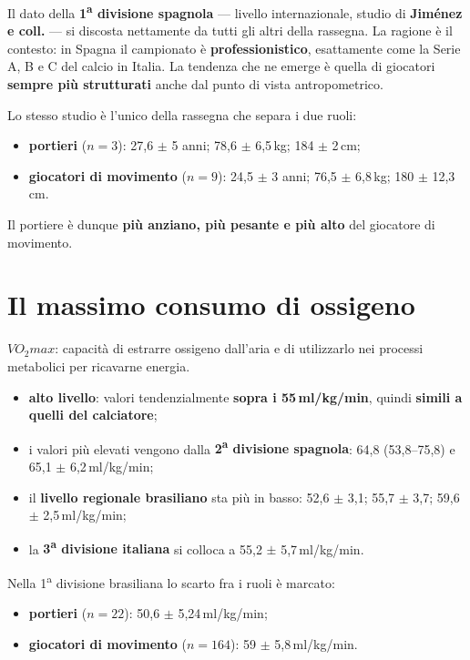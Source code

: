 Il dato della \textbf{1\textsuperscript{a} divisione spagnola} --- livello internazionale, studio
di \textbf{Jiménez e coll.} --- si discosta nettamente da tutti gli altri della rassegna. La
ragione è il contesto: in Spagna il campionato è \textbf{professionistico}, esattamente come la
Serie A, B e C del calcio in Italia. La tendenza che ne emerge è quella di giocatori
\textbf{sempre più strutturati} anche dal punto di vista antropometrico.

Lo stesso studio è l'unico della rassegna che separa i due ruoli:

\begin{itemize}
  \item \textbf{portieri} ($n = 3$): 27,6 $\pm$ 5 anni; 78,6 $\pm$ 6,5\,kg; 184 $\pm$ 2\,cm;
  \item \textbf{giocatori di movimento} ($n = 9$): 24,5 $\pm$ 3 anni; 76,5 $\pm$ 6,8\,kg;
    180 $\pm$ 12,3\,cm.
\end{itemize}

Il portiere è dunque \textbf{più anziano, più pesante e più alto} del giocatore di movimento.

\section{Il massimo consumo di ossigeno}

\textbf{$VO_2max$}: capacità di estrarre ossigeno dall'aria e di utilizzarlo nei processi
metabolici per ricavarne energia.

\begin{itemize}
  \item \textbf{alto livello}: valori tendenzialmente \textbf{sopra i 55\,ml/kg/min}, quindi
    \textbf{simili a quelli del calciatore};
  \item i valori più elevati vengono dalla \textbf{2\textsuperscript{a} divisione spagnola}:
    64,8 (53,8--75,8) e 65,1 $\pm$ 6,2\,ml/kg/min;
  \item il \textbf{livello regionale brasiliano} sta più in basso: 52,6 $\pm$ 3,1;
    55,7 $\pm$ 3,7; 59,6 $\pm$ 2,5\,ml/kg/min;
  \item la \textbf{3\textsuperscript{a} divisione italiana} si colloca a 55,2 $\pm$ 5,7\,ml/kg/min.
\end{itemize}

Nella 1\textsuperscript{a} divisione brasiliana lo scarto fra i ruoli è marcato:
\begin{itemize}
  \item \textbf{portieri} ($n = 22$): 50,6 $\pm$ 5,24\,ml/kg/min;
  \item \textbf{giocatori di movimento} ($n = 164$): 59 $\pm$ 5,8\,ml/kg/min.
\end{itemize}

